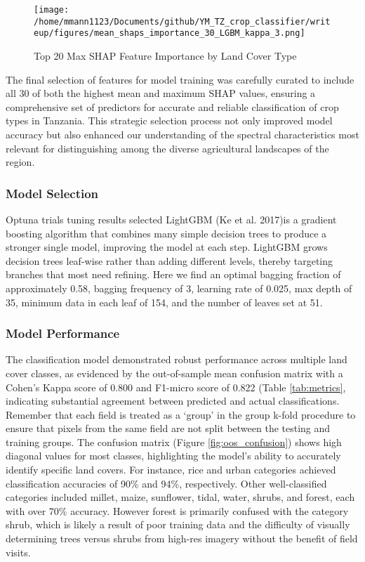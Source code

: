 \documentclass[
]{article}
\begin{document}
\begin{figure}[H]
    \centering
    \texttt{[image: /home/mmann1123/Documents/github/YM\_TZ\_crop\_classifier/writeup/figures/mean\_shaps\_importance\_30\_LGBM\_kappa\_3.png]} %
    \caption{Top 20 Max SHAP Feature Importance by Land Cover Type}
    \label{fig:max_shaps} %
\end{figure}

The final selection of features for model training was carefully curated
to include all 30 of both the highest mean and maximum SHAP values,
ensuring a comprehensive set of predictors for accurate and reliable
classification of crop types in Tanzania. This strategic selection
process not only improved model accuracy but also enhanced our
understanding of the spectral characteristics most relevant for
distinguishing among the diverse agricultural landscapes of the region.

\hypertarget{model-selection}{%
\subsubsection{Model Selection}\label{model-selection}}

Optuna trials tuning results selected LightGBM (Ke et al. 2017)is a
gradient boosting algorithm that combines many simple decision trees to
produce a stronger single model, improving the model at each step.
LightGBM grows decision trees leaf-wise rather than adding different
levels, thereby targeting branches that most need refining. Here we find
an optimal bagging fraction of approximately 0.58, bagging frequency of
3, learning rate of 0.025, max depth of 35, minimum data in each leaf of
154, and the number of leaves set at 51.

\hypertarget{model-performance}{%
\subsubsection{Model Performance}\label{model-performance}}

The classification model demonstrated robust performance across multiple
land cover classes, as evidenced by the out-of-sample mean confusion
matrix with a Cohen's Kappa score of 0.800 and F1-micro score of 0.822
(Table \ref{tab:metrics}, indicating substantial agreement between
predicted and actual classifications. Remember that each field is
treated as a `group' in the group k-fold procedure to ensure that pixels
from the same field are not split between the testing and training
groups. The confusion matrix (Figure \ref{fig:oos_confusion}) shows high
diagonal values for most classes, highlighting the model's ability to
accurately identify specific land covers. For instance, rice and urban
categories achieved classification accuracies of 90\% and 94\%,
respectively. Other well-classified categories included millet, maize,
sunflower, tidal, water, shrubs, and forest, each with over 70\%
accuracy. However forest is primarily confused with the category shrub,
which is likely a result of poor training data and the difficulty of
visually determining trees versus shrubs from high-res imagery without
the benefit of field visits.
\end{document}
